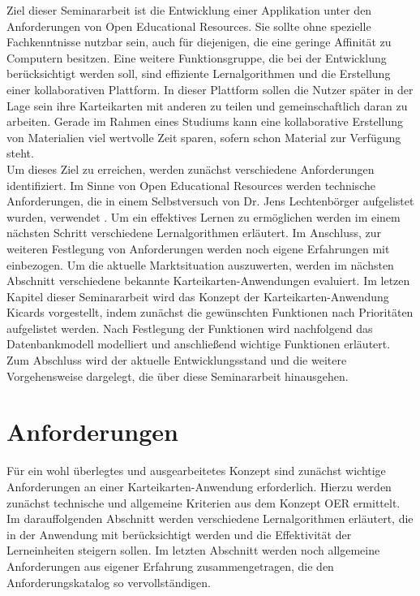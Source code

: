 Ziel dieser Seminararbeit ist die Entwicklung einer Applikation unter den Anforderungen von Open Educational Resources. Sie sollte ohne spezielle Fachkenntnisse nutzbar sein, auch für diejenigen, die eine geringe Affinität zu Computern besitzen. Eine weitere Funktionsgruppe, die bei der Entwicklung berücksichtigt werden soll, sind effiziente Lernalgorithmen und die Erstellung einer kollaborativen Plattform. In dieser Plattform sollen die Nutzer später in der Lage sein ihre Karteikarten mit anderen zu teilen und gemeinschaftlich daran zu arbeiten. Gerade im Rahmen eines Studiums kann eine kollaborative Erstellung von Materialien viel wertvolle Zeit sparen, sofern schon Material zur Verfügung steht. \\

Um dieses Ziel zu erreichen, werden zunächst verschiedene Anforderungen identifiziert. Im Sinne von Open Educational Resources werden technische Anforderungen, die in einem Selbstversuch von Dr. Jens Lechtenbörger aufgelistet wurden, verwendet \cite{Lechtenborger.2019}. Um ein effektives Lernen zu ermöglichen werden im einem nächsten Schritt verschiedene Lernalgorithmen erläutert. Im Anschluss, zur weiteren Festlegung von Anforderungen werden noch eigene Erfahrungen mit einbezogen. Um die aktuelle Marktsituation auszuwerten, werden im nächsten Abschnitt verschiedene bekannte Karteikarten-Anwendungen evaluiert. Im letzen Kapitel dieser Seminararbeit wird das Konzept der Karteikarten-Anwendung Kicards vorgestellt, indem zunächst die gewünschten Funktionen nach Prioritäten aufgelistet werden. Nach Festlegung der Funktionen wird nachfolgend das Datenbankmodell modelliert und anschließend wichtige Funktionen erläutert. Zum Abschluss wird der aktuelle Entwicklungsstand und die weitere Vorgehensweise dargelegt, die über diese Seminararbeit hinausgehen.

\section{Anforderungen}
Für ein wohl überlegtes und ausgearbeitetes Konzept sind zunächst wichtige Anforderungen an einer Karteikarten-Anwendung erforderlich. Hierzu werden zunächst technische und allgemeine Kriterien aus dem Konzept OER ermittelt. Im darauffolgenden Abschnitt werden verschiedene Lernalgorithmen erläutert, die in der Anwendung mit berücksichtigt werden und die Effektivität der Lerneinheiten steigern sollen. Im letzten Abschnitt werden noch allgemeine Anforderungen aus eigener Erfahrung zusammengetragen, die den Anforderungskatalog so vervollständigen.

